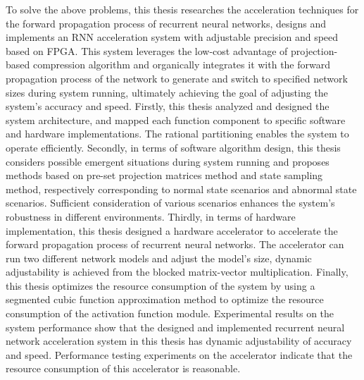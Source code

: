 \begin{englishabstract}
To solve the above problems, this thesis researches the acceleration techniques for the forward propagation process of recurrent neural networks, 
designs and implements an RNN acceleration system with adjustable precision and 
speed based on FPGA. 
This system leverages the low-cost advantage of projection-based compression algorithm and organically integrates it with 
the forward propagation process of the network to generate and switch to specified network sizes during system running, ultimately 
achieving the goal of adjusting the system's accuracy and speed. 
Firstly, this thesis analyzed and designed the system architecture, and mapped each function component to specific software 
and hardware implementations. The rational partitioning enables the system to operate efficiently.
Secondly, in terms of software algorithm design, this thesis considers possible emergent situations during system running 
and proposes methods based on pre-set projection matrices method and state sampling method, respectively corresponding to 
normal state scenarios and abnormal state scenarios. 
Sufficient consideration of various scenarios enhances the system's robustness in different environments.
Thirdly, in terms of hardware implementation, this thesis designed a hardware accelerator to accelerate the forward propagation 
process of recurrent neural networks. The accelerator can run two different network models and adjust the model's size, 
dynamic adjustability is achieved from the blocked matrix-vector multiplication.
Finally, this thesis optimizes the resource consumption of the system by using a segmented cubic function approximation method to 
optimize the resource consumption of the activation function module.
Experimental results on the system performance show that the designed and implemented recurrent neural network acceleration system 
in this thesis has dynamic adjustability of accuracy and speed. Performance testing experiments on the accelerator indicate that
the resource consumption of this accelerator is reasonable.

\end{englishabstract}
